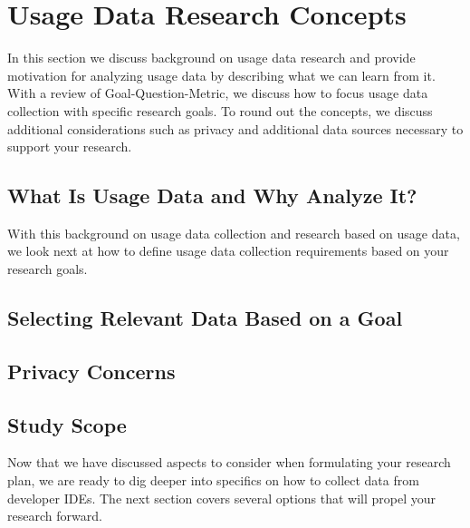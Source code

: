 
\section{Usage Data Research Concepts}

In this section we discuss background on usage data research and provide motivation for analyzing usage data by describing what we can learn from it.  With a review of Goal-Question-Metric, we discuss how to focus usage data collection with specific research goals.  To round out the concepts, we discuss additional considerations such as privacy and additional data sources necessary to support your research.

\subsection{What Is Usage Data and Why Analyze It?}

\vspace{0.1in}

With this background on usage data collection and research based on usage data, we look next at how to define usage data collection requirements based on your research goals.

\subsection{Selecting Relevant Data Based on a Goal}



\subsection{Privacy Concerns}


\subsection{Study Scope}


\vspace{0.1in}
Now that we have discussed aspects to consider when formulating your research plan, we are ready to dig deeper into specifics on how to collect data from developer IDEs.  The next section covers several options that will propel your research forward.

